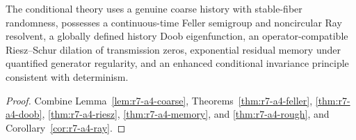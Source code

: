 \begin{theorem}
\label{thm:r7-a4-main}
The conditional theory uses a genuine coarse history with stable-fiber
randomness, possesses a continuous-time Feller semigroup and noncircular Ray
resolvent, a globally defined history Doob eigenfunction, an
operator-compatible Riesz--Schur dilation of transmission zeros, exponential
residual memory under quantified generator regularity, and an enhanced
conditional invariance principle consistent with determinism.
\end{theorem}

\begin{proof}
Combine Lemma~\ref{lem:r7-a4-coarse},
Theorems~\ref{thm:r7-a4-feller},
\ref{thm:r7-a4-doob},
\ref{thm:r7-a4-riesz},
\ref{thm:r7-a4-memory}, and
\ref{thm:r7-a4-rough}, and
Corollary~\ref{cor:r7-a4-ray}.
\end{proof}
